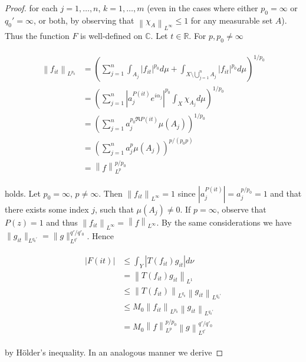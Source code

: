 \begin{proof}
for each $j = 1,\hdots,n$, $k = 1,\hdots,m$ (even in the cases where either $p_0 = \infty$ or $q_0' = \infty$, or both, by observing that $\left\| \chi_{A}\right\|_{L^\infty} \leqslant 1$ for any measurable set $A$). Thus the function $F$ is well-defined on $\mathbb{C}$. Let $t \in \mathbb{R}$. For $p,p_0 \neq \infty$

\begin{gather*}
	\begin{aligned}
		\left\|f_{it}\right\|_{L^{p_0}} &= \left(\sum_{j = 1}^n \int_{A_j} \left| f_{it} \right|^{p_0} d\mu + \int_{X \setminus \bigcup_{j = 1}^n A_j} \left| f_{it} \right|^{p_0} d\mu\right)^{1/p_0}\\
		&= \left(\sum_{j = 1}^n \left| a_j^{P(it)} e^{i\alpha_j}\right|^{p_0}\int_X \chi_{A_j} d\mu\right)^{1/p_0}\\
		&= \left(\sum_{j = 1}^n a_j^{p_0\Re P(it)}\mu\left(A_j\right)\right)^{1/p_0}\\
		&= \left(\sum_{j = 1}^n a_j^p\mu\left(A_j\right)\right)^{p/\left(p_0p\right)}\\
		&= \left\|f\right\|_{L^p}^{p/p_0} 
	\end{aligned}
\end{gather*}

holds. Let $p_0 = \infty$, $p \neq \infty$. Then $\left\|f_{it}\right\|_{L^{\infty}} = 1$ since $\left| a_j^{P(it)}\right| = a_j^{p/p_0} = 1$ and that there exists some index $j$, such that $\mu\left( A_j \right) \neq 0$. If $p = \infty$, observe that $P(z) = 1$ and thus $\left\| f_{it}\right\|_{L^{\infty}} = \left\| f\right\|_{L^{\infty}}$. By the same considerations we have $\|g_{it}\|_{L^{q_0'}} = \|g\|_{L^{q'}}^{q'/q'_0}$. Hence

\begin{gather*}
	\begin{aligned}
		\left| F(it) \right| &\leqslant \int_Y \left| T(f_{it})g_{it}\right| d\nu\\
		&= \left\|T(f_{it}) g_{it}\right\|_{L^1}\\
		&\leqslant \left\|T(f_{it})\right\|_{L^{q_0}}\left\|g_{it}\right\|_{L^{q_0'}}\\
		&\leqslant M_0 \left\|f_{it}\right\|_{L^{p_0}} \left\|g_{it}\right\|_{L^{q_0'}}\\
		&= M_0 \left\|f\right\|_{L^p}^{p/p_0} \left\|g\right\|_{L^{q'}}^{q'/q'_0}
	\end{aligned}
\end{gather*}

by H\"older's inequality. In an analogous manner we derive
				

\end{proof}
